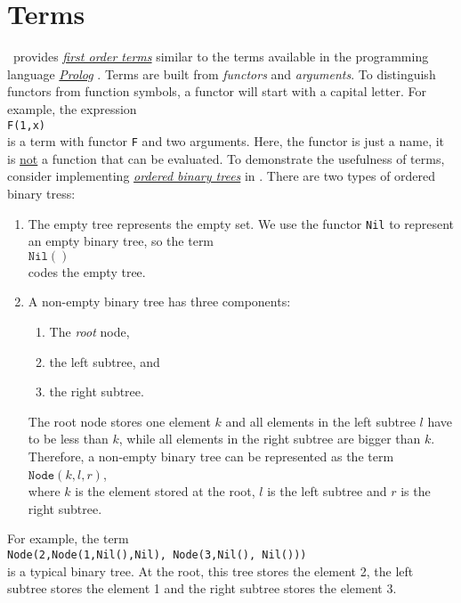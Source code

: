 \section{Terms}
\setlx\ provides 
\href{http://en.wikipedia.org/wiki/Term_(first-order_logic)#Terms}{\emph{first order terms}}
similar to the terms available in the programming language 
\href{http://en.wikipedia.org/wiki/Prolog}{\emph{Prolog}} \cite{sterling:94}.
Terms are built from \emph{functors} and \emph{arguments}.  To distinguish functors from function
symbols, a functor will start with a capital letter.  For example, the expression
\\[0.2cm]
\hspace*{1.3cm}
\texttt{F(1,x)}
\\[0.2cm]
is a term with functor \texttt{F} and two arguments.  Here, the functor is just a name, it is 
\underline{not} a function that can be evaluated.  To demonstrate the usefulness of terms, consider
implementing \href{http://en.wikipedia.org/wiki/Binary_search_tree}{\emph{ordered binary trees}} in \setlx. 
There are two types of ordered binary tress:
\begin{enumerate}
\item The empty tree represents the empty set.  We use the functor \texttt{Nil} to represent an
      empty binary tree, so the term
      \\[0.2cm]
      \hspace*{1.3cm}
      $\mathtt{Nil()}$
      \\[0.2cm]
      codes the empty tree.
\item A non-empty binary tree has three components:
      \begin{enumerate}
      \item The \emph{root} node,
      \item the left subtree, and
      \item the right subtree.
      \end{enumerate}
      The root node stores one element $k$ and all elements in the left subtree $l$ have to be less
      than $k$, while all elements in the right subtree are bigger than $k$.  Therefore, a non-empty
      binary tree can be represented as the term
      \\[0.2cm]
      \hspace*{1.3cm}
      $\texttt{Node}(k, l, r)$,
      \\[0.2cm]
      where $k$ is the element stored at the root, $l$ is the left subtree and $r$ is the right subtree.
\end{enumerate}
For example, the term
\\[0.2cm]
\hspace*{1.3cm}
\texttt{Node(2,Node(1,Nil(),Nil), Node(3,Nil(), Nil()))}
\\[0.2cm]
is a typical binary tree.  At the root, this tree stores the element 2, the left subtree
stores the element 1 and the right subtree stores the element 3.

